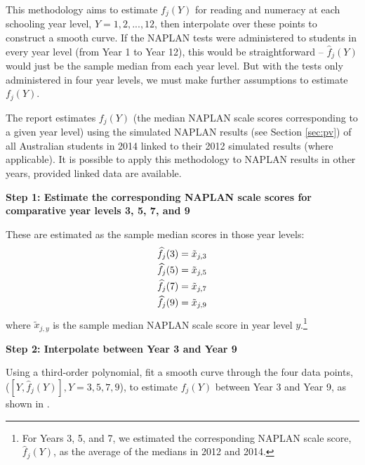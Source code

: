 This methodology aims to estimate $f_{j}(Y)$ for reading and numeracy at each schooling year level, $Y = 1,2,...,12$, then interpolate over these points to construct a smooth curve. If the NAPLAN tests were administered to students in every year level (from Year 1 to Year 12), this would be straightforward -- $\widehat{f}_{j}(Y)$ would just be the sample median from each year level. But with the tests only administered in four year levels, we must make further assumptions to estimate $f_{j}(Y)$.

The report estimates $f_{j}(Y)$ (the median NAPLAN scale scores corresponding to a given year level) using the simulated NAPLAN results (see Section \ref{sec:pv}) of all Australian students in 2014 linked to their 2012 simulated results (where applicable). It is possible to apply this methodology to NAPLAN results in other years, provided linked data are available.

\textbf{Step 1: Estimate the corresponding NAPLAN scale scores for comparative year levels 3, 5, 7, and 9}
\nopagebreak

These are estimated as the sample median scores in those year levels:
\begin{equation} \begin{array}{c}
\widehat{f}_{j}(3) = \tilde{x}_{j,3} \vspace{0.3em}\\ \widehat{f}_{j}(5) = \tilde{x}_{j,5} \vspace{0.3em}\\ \widehat{f}_{j}(7) = \tilde{x}_{j,7} \vspace{0.3em}\\ \widehat{f}_{j}(9) = \tilde{x}_{j,9}
\end{array} \end{equation}
where $\tilde{x}_{j,y}$ is the sample median NAPLAN scale score in year level $y$.\footnote{For Years 3, 5, and 7, we estimated the corresponding NAPLAN scale score, $\widehat{f}_{j}(Y)$, as the average of the medians in 2012 and 2014.}

\textbf{Step 2: Interpolate between Year 3 and Year 9}
\nopagebreak

Using a third-order polynomial, fit a smooth curve through the four data points, ($[Y,\widehat{f}_{j}(Y)], Y = 3,5,7,9$), to estimate $f_{j}(Y)$ between Year 3 and Year 9, as shown in .

